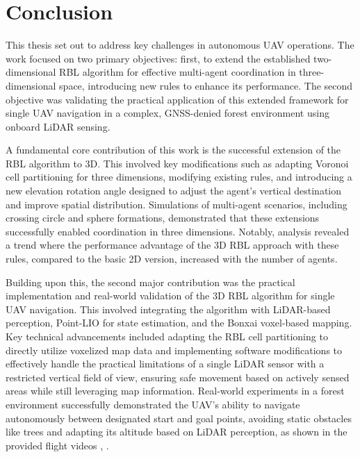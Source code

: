 
\chapter{Conclusion\label{chap:conclusion}}

This thesis set out to address key challenges in autonomous \ac{UAV} operations. 
The work focused on two primary objectives: first, to extend the established two-dimensional \ac{RBL} algorithm for effective multi-agent coordination in three-dimensional space, introducing new rules to enhance its performance. 
The second objective was validating the practical application of this extended framework for single  \ac{UAV} navigation in a complex, GNSS-denied forest environment using onboard \ac{LiDAR} sensing.

A fundamental core contribution of this work is the successful extension of the \ac{RBL} algorithm to 3D.
This involved key modifications such as adapting Voronoi cell partitioning for three dimensions, modifying existing rules, and introducing a new elevation rotation angle designed to adjust the agent's vertical destination and improve spatial distribution. 
Simulations of multi-agent scenarios, including crossing circle and sphere formations, demonstrated that these extensions successfully enabled coordination in three dimensions. 
Notably, analysis revealed a trend where the performance advantage of the 3D \ac{RBL} approach with these rules, compared to the basic 2D version, increased with the number of agents.

Building upon this, the second major contribution was the practical implementation and real-world validation of the 3D \ac{RBL} algorithm for single  \ac{UAV} navigation. 
This involved integrating the algorithm with \ac{LiDAR}-based perception, Point-LIO for state estimation, and the Bonxai voxel-based mapping. 
Key technical advancements included adapting the \ac{RBL} cell partitioning to directly utilize voxelized map data and implementing software modifications to effectively handle the practical limitations of a single \ac{LiDAR} sensor with a restricted vertical field of view, ensuring safe movement based on actively sensed areas while still leveraging map information. 
Real-world experiments in a forest environment successfully demonstrated the  \ac{UAV}'s ability to navigate autonomously between designated start and goal points, avoiding static obstacles like trees and adapting its altitude based on \ac{LiDAR} perception, as shown in the provided flight videos \cite{aggressive_flight}, \cite{conservative_flight}.

